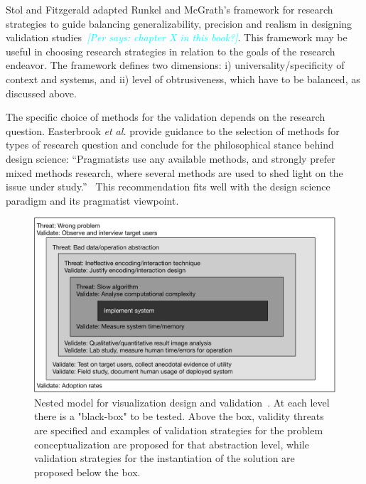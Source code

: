 \documentclass[graybox]{svmult}
\newcommand{\peggy}[1]{\textcolor{blue}{{\it [Peggy says: #1]}}}
\newcommand{\per}[1]{\textcolor{cyan}{{\it [Per says: #1]}}}
\newcommand{\peggy}[1]{}
\newcommand{\per}[1]{}
\begin{document}
Stol and Fitzgerald adapted Runkel and McGrath's framework for research strategies to guide balancing generalizability, precision and realism in designing validation studies~\cite{StolABC18}\per{chapter X in this book?}. This framework may be useful in choosing research strategies in relation to the goals of the research endeavor. The framework defines two dimensions: i) universality/specificity of context and systems, and ii) level of obtrusiveness, which have to be balanced, as discussed above. %

The specific choice of methods for the validation depends on the research question. Easterbrook \emph{et al.} provide guidance to the selection of methods for types of research question and conclude for the philosophical stance behind design science: ``Pragmatists use any available methods, and strongly prefer mixed methods research, where several methods are used to shed light on the issue under study.''~\cite{easterbrook_selecting_2008} 
This recommendation fits well with the design science paradigm and its pragmatist viewpoint.

\begin{figure}[t]
  \includegraphics[width=\textwidth]{Figures/nested_model.pdf}
\caption{Nested model for visualization design and validation~\cite{munzner2009}. At each level there is a "black-box" to be tested. Above the box, validity threats are specified and examples of validation strategies for the problem conceptualization are proposed for that abstraction level, while validation strategies for the instantiation of the solution are proposed below the box.}\label{fig:nested_model}       %
\end{figure} 
\end{document}
